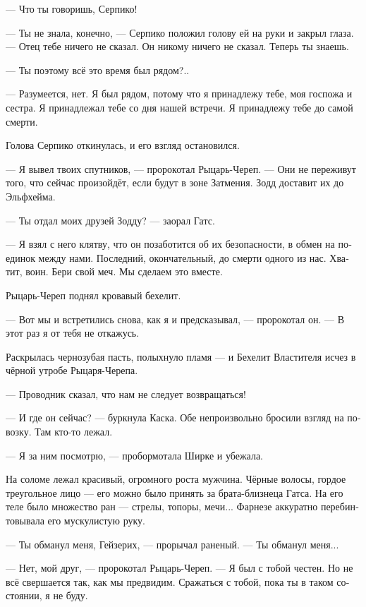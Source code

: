 \documentclass[a4paper,12pt,fleqn]{book}\usepackage{polyglossia}\setdefaultlanguage[babelshorthands=true]{russian}\setotherlanguage{english}\defaultfontfeatures{Ligatures=TeX,Mapping=tex-text}\usepackage{xcolor}\newcommand{\ml}[3]{#2}
\newcommand{\textspace}{\vspace{1em}{\centering\Large\bfseries<...>\par}\vspace{1em}}
\begin{document}
--- Что ты говоришь, Серпико!

--- Ты не знала, конечно, --- Серпико положил голову ей на руки и закрыл глаза.
--- Отец тебе ничего не сказал.
Он никому ничего не сказал.
Теперь ты знаешь.

--- Ты поэтому всё это время был рядом?..

--- Разумеется, нет.
Я был рядом, потому что я принадлежу тебе, моя госпожа и сестра.
Я принадлежал тебе со дня нашей встречи.
Я принадлежу тебе до самой смерти.

Голова Серпико откинулась, и его взгляд остановился.

\textspace

--- Я вывел твоих спутников, --- пророкотал Рыцарь-Череп.
--- Они не переживут того, что сейчас произойдёт, если будут в зоне Затмения.
Зодд доставит их до Эльфхейма.

--- Ты отдал моих друзей Зодду? --- заорал Гатс.

--- Я взял с него клятву, что он позаботится об их безопасности, в обмен на поединок между нами.
Последний, окончательный, до смерти одного из нас.
Хватит, воин.
Бери свой меч.
Мы сделаем это вместе.

\textspace

Рыцарь-Череп поднял кровавый бехелит.

--- Вот мы и встретились снова, как я и предсказывал, --- пророкотал он.
--- В этот раз я от тебя не откажусь.

Раскрылась чернозубая пасть, полыхнуло пламя --- и Бехелит Властителя исчез в чёрной утробе Рыцаря-Черепа.

\textspace

--- Проводник сказал, что нам не следует возвращаться!

--- И где он сейчас? --- буркнула Каска.
Обе непроизвольно бросили взгляд на повозку.
Там кто-то лежал.

--- Я за ним посмотрю, --- пробормотала Ширке и убежала.

\textspace

На соломе лежал красивый, огромного роста мужчина.
Чёрные волосы, гордое треугольное лицо --- его можно было принять за брата-близнеца Гатса.
На его теле было множество ран --- стрелы, топоры, мечи...
Фарнезе аккуратно перебинтовывала его мускулистую руку.

--- Ты обманул меня, Гейзерих, --- прорычал раненый.
--- Ты обманул меня...

--- Нет, мой друг, --- пророкотал Рыцарь-Череп.
--- Я был с тобой честен.
Но не всё свершается так, как мы предвидим.
Сражаться с тобой, пока ты в таком состоянии, я не буду.
\end{document}
